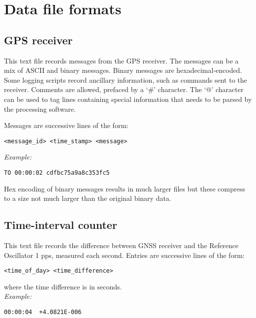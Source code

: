 \section{Data file formats \label{s:DataFileFormat}}

\subsection{GPS receiver}

This text file records messages from the GPS receiver. The messages can be a mix of ASCII and binary messages.
Binary messages are hexadecimal-encoded. Some logging scripts record ancillary information, 
such as commands sent to the receiver. Comments are allowed, prefaced by a `\#' character. 
The `@' character can be used to tag lines containing special information that needs to be parsed by
the processing software.

Messages are successive lines of the form:
\begin{lstlisting}
<message_id> <time_stamp> <message>
\end{lstlisting}
\textit{Example:}
\begin{lstlisting}
TO 00:00:02 cdfbc75a9a8c353fc5
\end{lstlisting}

Hex encoding of binary messages results in much larger files but these compress to a size not much larger
than the original binary data.

\subsection{Time-interval counter}

This text file records the difference between GNSS receiver and the Reference Oscillator 1 pps,
measured each second. Entries are successive lines of the form:
\begin{lstlisting}
<time_of_day> <time_difference>
\end{lstlisting}
where the time difference is in seconds.\\
\textit{Example:}
\begin{lstlisting}
00:00:04  +4.0821E-006 
\end{lstlisting}










